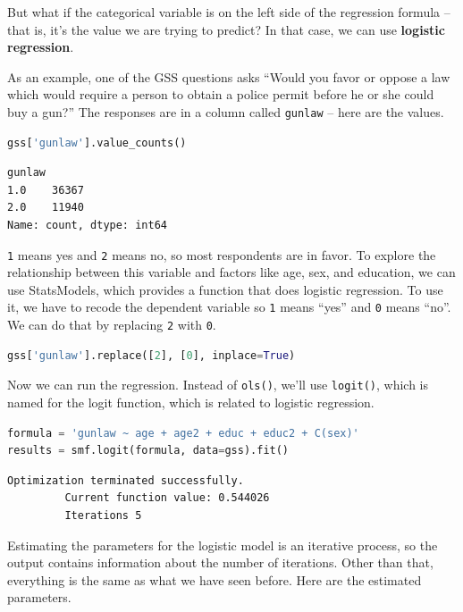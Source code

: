 But what if the categorical variable is on the left side of the
regression formula -- that is, it's the value we are trying to predict?
In that case, we can use \textbf{logistic regression}.

As an example, one of the GSS questions asks ``Would you favor or oppose
a law which would require a person to obtain a police permit before he
or she could buy a gun?'' The responses are in a column called
\passthrough{\lstinline!gunlaw!} -- here are the values.

\begin{lstlisting}[language=Python,style=source]
gss['gunlaw'].value_counts()
\end{lstlisting}

\begin{lstlisting}[style=output]
gunlaw
1.0    36367
2.0    11940
Name: count, dtype: int64
\end{lstlisting}

\passthrough{\lstinline!1!} means yes and \passthrough{\lstinline!2!}
means no, so most respondents are in favor. To explore the relationship
between this variable and factors like age, sex, and education, we can
use StatsModels, which provides a function that does logistic
regression. To use it, we have to recode the dependent variable so
\passthrough{\lstinline!1!} means ``yes'' and
\passthrough{\lstinline!0!} means ``no''. We can do that by replacing
\passthrough{\lstinline!2!} with \passthrough{\lstinline!0!}.

\begin{lstlisting}[language=Python,style=source]
gss['gunlaw'].replace([2], [0], inplace=True)
\end{lstlisting}

Now we can run the regression. Instead of
\passthrough{\lstinline!ols()!}, we'll use
\passthrough{\lstinline!logit()!}, which is named for the logit
function, which is related to logistic regression.

\begin{lstlisting}[language=Python,style=source]
formula = 'gunlaw ~ age + age2 + educ + educ2 + C(sex)'
results = smf.logit(formula, data=gss).fit()
\end{lstlisting}

\begin{lstlisting}[style=output]
Optimization terminated successfully.
         Current function value: 0.544026
         Iterations 5
\end{lstlisting}

Estimating the parameters for the logistic model is an iterative
process, so the output contains information about the number of
iterations. Other than that, everything is the same as what we have seen
before. Here are the estimated parameters.

